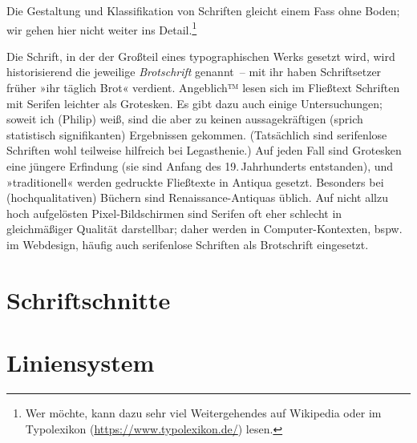 Die Gestaltung und Klassifikation von Schriften gleicht einem Fass
ohne Boden; wir gehen hier nicht weiter ins Detail.\footnote{Wer
  möchte, kann dazu sehr viel Weitergehendes auf Wikipedia oder im
  Typo\-lexikon (\url{https://www.typolexikon.de/}) lesen.}

Die Schrift, in der der Großteil eines typographischen Werks gesetzt
wird, wird historisierend die jeweilige \emph{Brotschrift} genannt~--
mit ihr haben Schriftsetzer früher »ihr täglich Brot« verdient.
Angeblich™ lesen sich im Fließtext Schriften mit Serifen leichter als
Grotesken.  Es gibt dazu auch einige Untersuchungen; soweit ich
(Philip) weiß, sind die aber zu keinen aussagekräftigen (sprich
statistisch signifikanten) Ergebnissen gekommen.  (Tatsächlich sind
serifenlose Schriften wohl teilweise hilfreich bei Legasthenie.)  Auf
jeden Fall sind Grotesken eine jüngere Erfindung (sie sind Anfang des
19.\,Jahrhunderts entstanden), und »traditionell« werden gedruckte
Fließtexte in Antiqua gesetzt.  Besonders bei (hochqualitativen)
Büchern sind Renaissance-Antiquas üblich.  Auf nicht allzu hoch
aufgelösten Pixel-Bildschirmen sind Serifen oft eher schlecht in
gleichmäßiger Qualität darstellbar; daher werden in
Computer-Kontexten, bspw. im Webdesign, häufig auch serifenlose
Schriften als Brotschrift eingesetzt.

\section{Schriftschnitte}
\label{sec:Schnitte}


\section{Liniensystem}
\label{sec:Linien}




